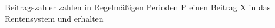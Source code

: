 




Beitragszahler zahlen in Regelmäßigen Perioden P einen Beitrag X in das Rentensystem und erhalten 


